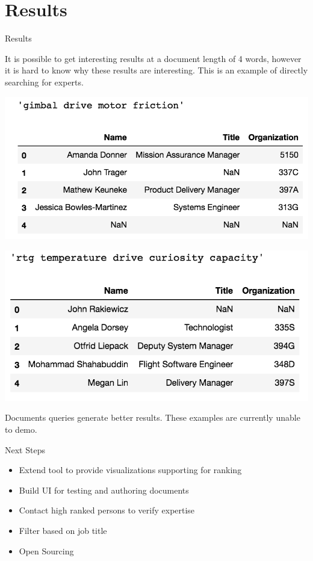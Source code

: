 \documentclass[10pt]{beamer}
\begin{document}
\section{Results}

\begin{frame}{Results}

  It is possible to get interesting results at a document length of 4 words,
  however it is hard to know why these results are interesting.
  This is an example of directly searching for experts.

  \begin{multicols}{2}
    \includegraphics[width=\columnwidth]{query1.png}

    \includegraphics[width=\columnwidth]{query2.png}
  \end{multicols}

  Documents queries generate better results. These examples are
  currently unable to demo.

\end{frame}

\begin{frame}{Next Steps}
  \begin{itemize}
  \item Extend tool to provide visualizations supporting for ranking
  \item Build UI for testing and authoring documents
  \item Contact high ranked persons to verify expertise
  \item Filter based on job title
  \item Open Sourcing
  \end{itemize}

\end{frame}
\end{document}
